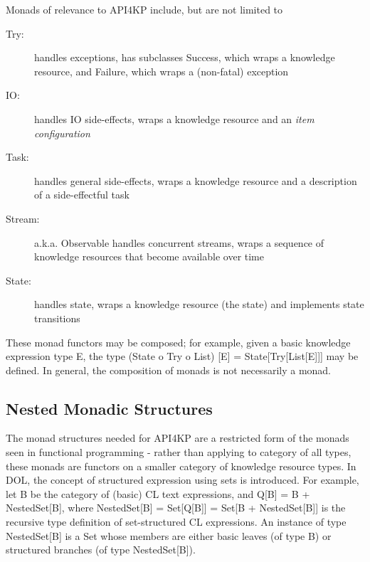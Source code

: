 \documentclass[runningheads]{llncs}
\begin{document}
Monads of relevance to API4KP include, but are not limited to
\begin{description}
\item [Try:] handles exceptions, has subclasses Success, which wraps a knowledge resource, and Failure, which wraps a (non-fatal) exception
\item [IO:] handles IO side-effects, wraps a knowledge resource and an \emph{item configuration}
\item [Task:] handles general side-effects, wraps a knowledge resource and a description of a side-effectful task
\item [Stream:] a.k.a. Observable handles concurrent streams, wraps a sequence of knowledge resources that become available over time
\item [State:] handles state, wraps a knowledge resource (the state) and implements state transitions
\end{description}
These monad functors may be composed; for example, given a basic knowledge expression type E, the type (State o Try o List) [E] = State[Try[List[E]]] may be defined.
In general, the composition of monads is not necessarily a monad. 

\vspace{-0.3cm}
\subsection{Nested Monadic Structures}
The monad structures needed for API4KP are a restricted form of the monads seen in functional programming - rather than applying to category of all types, these monads are functors on a smaller category of knowledge resource types. In DOL, the concept of structured expression using sets is introduced. For example, let B be the category of (basic) CL text expressions, and Q[B] = B + NestedSet[B], where NestedSet[B] = Set[Q[B]] = Set[B + NestedSet[B]]  is the recursive type definition of set-structured CL expressions. An instance of type NestedSet[B] is a Set whose members are either  basic leaves (of type B) or structured branches (of type NestedSet[B]). 
\end{document}
